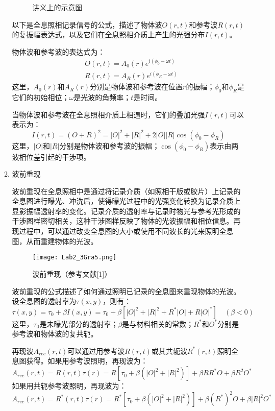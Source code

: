 \documentclass[dvipsnames, svgnames,a4paper,11pt]{article}
\begin{document}
\begin{enumerate}
\begin{enumerate}
			\begin{figure}[htbp]
				\centering
				\caption{讲义上的示意图}
				\label{fig:fig3}			
			\end{figure}
			
			以下是全息照相记录信号的公式，描述了物体波\(O(r,t)\)和参考波\(R(r,t)\)的复振幅表达式，以及它们在全息照相介质上产生的光强分布\(I(r,t)\)。
			
			物体波和参考波的表达式为：
			\[
			\begin{aligned}
				& O(r,t)=A_0(r)e^{i(\phi_0-\omega t)}\\
				& R(r,t)=A_R(r)e^{i(\phi_R-\omega t)}
			\end{aligned}
			\]
			这里，\(A_0(r)\)和\(A_R(r)\)分别是物体波和参考波在位置\(r\)的振幅；\(\phi_0\)和\(\phi_R\)是它们的初始相位；\(\omega\)是光波的角频率；\(t\)是时间。
			
			当物体波和参考波在全息照相介质上相遇时，它们的叠加光强\(I(r,t)\)可以表示为：
			\[
			I(r,t) = (O+R)^2 = |O|^2 + |R|^2 + 2|O||R|\cos(\phi_0-\phi_R)
			\]
			这里，\(|O|\)和\(|R|\)分别是物体波和参考波的振幅；\(\cos(\phi_0-\phi_R)\)表示由两波相位差引起的干涉项。
			
			\item 波前重现
			
			波前重现在全息照相中是通过将记录介质（如照相干版或胶片）上记录的全息图进行曝光、冲洗后，使得曝光过程中的光强变化转换为记录介质上显影振幅透射率的变化。记录介质的透射率与记录时物光与参考光形成的干涉图样密切相关，这种干涉图样反映了物体的光波振幅和相位信息。再现过程中，可以通过改变全息图的大小或使用不同波长的光来照明全息图，从而重建物体的光波。
			
			\begin{figure}[htbp]
				\centering
				\texttt{[image: Lab2\_3Gra5.png]}
				\caption{波前重现（参考文献[1]）}
				\label{fig:fig5}
			\end{figure}
			
			波前重现的公式描述了如何通过照明已记录的全息图来重现物体的光波。设全息图的透射率为\(\tau(x,y)\)，则有：
			\[
			\tau(x,y)=\tau_0+\beta I(x,y)=\tau_0+\beta\left[|O|^2+|R|^2+R^*|O|+R|O|^*\right] \quad (\beta<0)
			\]
			这里，\(\tau_0\)是未曝光部分的透射率；\(\beta\)是与材料相关的常数；\(R^*\)和\(O^*\)分别是参考波和物体波的复共轭。
			
			再现波\(A_{rec}(r,t)\)可以通过用参考波\(R(r,t)\)或其共轭波\(R^*(r,t)\)照明全息图获得。如果用参考波照明，再现波为：
			\[
			A_{rec}(r,t)=R(r,t)\tau(r)=R\left[\tau_0+\beta\left(|O|^2+|R|^2\right)\right]+\beta RR^*O+\beta R^2O^*
			\]
			如果用共轭参考波照明，再现波为：
			\[
			A_{rec}(r,t)=R^*(r,t)\tau(r)=R^*\left[\tau_0+\beta\left(|O|^2+|R|^2\right)\right]+\beta (R^*)^2O+\beta |R|^2O^*
			\]
		\end{enumerate}
		

\end{enumerate}
\end{document}
